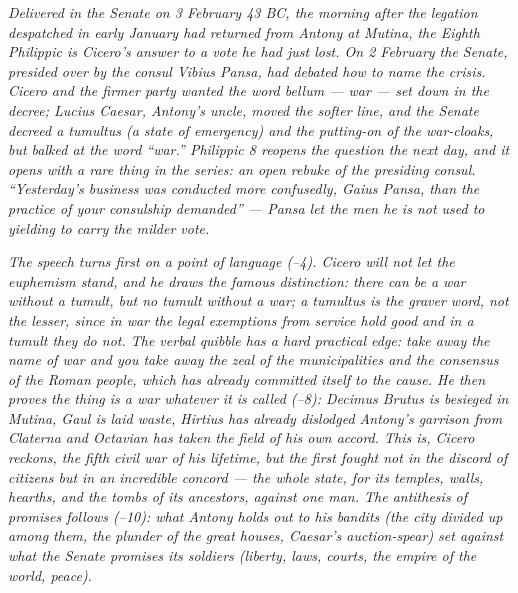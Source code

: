 
\textit{Delivered in the Senate on 3 February 43 BC, the morning
after the legation despatched in early January had returned from
Antony at Mutina, the Eighth Philippic is Cicero's answer to a
vote he had just lost. On 2 February the Senate, presided over by
the consul Vibius Pansa, had debated how to name the crisis. Cicero
and the firmer party wanted the word \textit{bellum} --- war ---
set down in the decree; Lucius Caesar, Antony's uncle, moved the
softer line, and the Senate decreed a \textit{tumultus} (a state
of emergency) and the putting-on of the war-cloaks, but balked at
the word ``war.'' Philippic 8 reopens the question the next day,
and it opens with a rare thing in the series: an open rebuke of the
presiding consul. ``Yesterday's business was conducted more
confusedly, Gaius Pansa, than the practice of your consulship
demanded'' --- Pansa let the men he is not used to yielding to
carry the milder vote.}

\textit{The speech turns first on a point of language
(--4). Cicero will not let the euphemism stand,
and he draws the famous distinction: there can be a war without a
tumult, but no tumult without a war; a \textit{tumultus} is the
graver word, not the lesser, since in war the legal exemptions
from service hold good and in a tumult they do not. The verbal
quibble has a hard practical edge: take away the name of war and
you take away the zeal of the municipalities and the consensus of
the Roman people, which has already committed itself to the cause.
He then proves the thing is a war whatever it is called
(--8): Decimus Brutus is besieged in Mutina, Gaul
is laid waste, Hirtius has already dislodged Antony's garrison
from Claterna and Octavian has taken the field of his own accord.
This is, Cicero reckons, the fifth civil war of his lifetime, but
the first fought not in the discord of citizens but in an
incredible concord --- the whole state, for its temples, walls,
hearths, and the tombs of its ancestors, against one man. The
antithesis of promises follows (--10): what Antony
holds out to his bandits (the city divided up among them, the
plunder of the great houses, Caesar's auction-spear) set against
what the Senate promises its soldiers (liberty, laws, courts, the
empire of the world, peace).}


